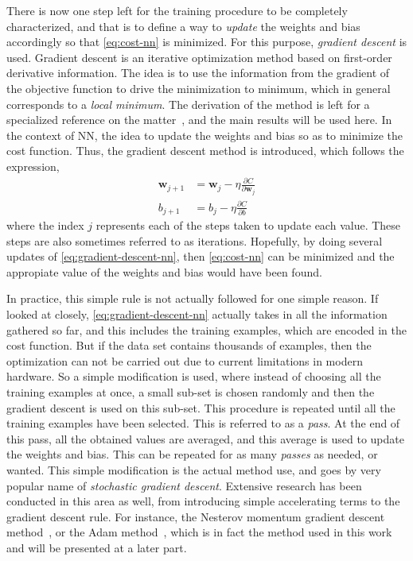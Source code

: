 There is now one step left for the training procedure to be completely characterized, and 
that is to define a way to \emph{update} the weights and bias accordingly so that 
\autoref{eq:cost-nn} is minimized. For this purpose, \emph{gradient descent} is used. 
Gradient descent is an iterative optimization method based on first-order derivative 
information. The idea is to use the information from the gradient of the objective function 
to drive the minimization to minimum, which in general corresponds to a \emph{local minimum}. The derivation of the method is left for a specialized reference on the 
matter~\cite{nocedalNumericalOptimization2006}, and the main results will be used here. In 
the context of NN, the idea to update the weights and bias so as to minimize the cost 
function. Thus, the gradient descent method is introduced, which follows the expression,
\begin{equation}
    \begin{aligned}
        \bm{w}_{j+1} &= \bm{w}_{j} - \eta \frac{\partial C}{\partial \bm{w}_{j}} \\
        b_{j+1} &= b_{j} - \eta \frac{\partial C}{\partial b}
    \end{aligned}
    \label{eq:gradient-descent-nn}
\end{equation}
where the index \(j\) represents each of the steps taken to update each value. These steps 
are also sometimes referred to as iterations. Hopefully, by doing several updates of 
\autoref{eq:gradient-descent-nn}, then \autoref{eq:cost-nn} can be minimized and the 
appropiate value of the weights and bias would have been found.

In practice, this simple rule is not actually followed for one simple reason. If looked at 
closely, \autoref{eq:gradient-descent-nn} actually takes in all the information gathered so 
far, and this includes the training examples, which are encoded in the cost function. But 
if the data set contains thousands of examples, then the optimization can not be carried 
out due to current limitations in modern hardware. So a simple modification is used, where 
instead of choosing all the training examples at once, a small sub-set is chosen randomly 
and then the gradient descent is used on this sub-set. 
This procedure is repeated until all the 
training examples have been selected. This is referred to as a 
\emph{pass}. At the end of this pass, all the obtained values are averaged, and this 
average is used to update the weights and bias. This can be repeated for as many 
\emph{passes} as needed, or wanted. This simple modification is the actual 
method use, and goes by very popular name of \emph{stochastic gradient descent}.
Extensive research has been conducted in this area as well, from introducing simple
accelerating terms to the gradient descent rule. For instance, the Nesterov momentum 
gradient descent method~\cite{ruderOverviewGradientDescent2017}, or the Adam 
method~\cite{kingmaAdamMethodStochastic2017}, which is in fact the method used in this work 
and will be presented at a later part.

